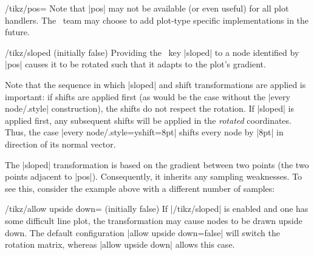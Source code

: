 {\begin{key}{/tikz/pos=}
	Note that |pos| may not be available (or even useful) for all plot handlers. The \PGFPlots\ team may choose to add plot-type specific implementations in the future.
\end{key}

\begin{key}{/tikz/sloped (initially false)}
	Providing the \Tikz\ key |sloped| to a node identified by |pos| causes it to be rotated such that it adapts to the plot's gradient.
\pgfplotsexpensiveexample
\begin{codeexample}[]
\end{codeexample}
	Note that the sequence in which |sloped| and shift transformations are applied is important: if shifts are applied first (as would be the case without the |every node/.style| construction), the shifts do not respect the rotation. If |sloped| is applied first, any subsequent shifts will be applied in the \emph{rotated} coordinates. Thus, the case |every node/.style={yshift=8pt}| shifts every node by |8pt| in direction of its normal vector.

	The |sloped| transformation is based on the gradient between two points (the two points adjacent to |pos|). Consequently, it inherits any sampling weaknesses. To see this, consider the example above with a different number of samples:
\pgfplotsexpensiveexample
\begin{codeexample}[]
\end{codeexample}
\end{key}

\begin{key}{/tikz/allow upside down= (initially false)}
	If |/tikz/sloped| is enabled and one has some difficult line plot, the transformation may cause nodes to be drawn upside down. The default configuration |allow upside down=false| will switch the rotation matrix, whereas |allow upside down| allows this case.
\end{key}

}

